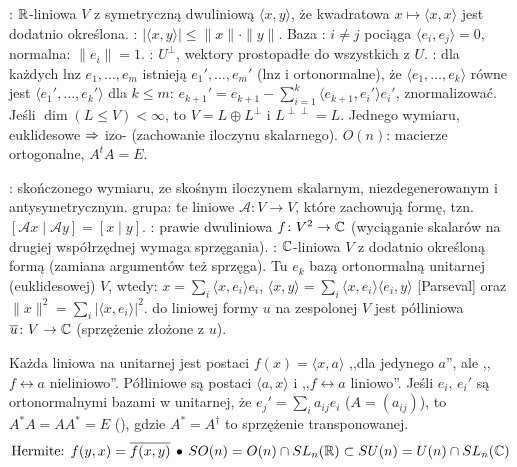 :  $\mathbb{R}$-liniowa $V$ z symetryczną dwuliniową $\langle x,y\rangle$, że kwadratowa $x \mapsto \langle x,x\rangle$ jest dodatnio określona. 
: $|\langle x,y\rangle| \le \|x\| \cdot \|y\|$.
Baza : $i \neq j$ pociąga $\langle e_i, e_j \rangle = 0$, normalna: $\|e_i\| = 1$.
: $U^\perp$, wektory prostopadłe do wszystkich z $U$.
: dla każdych lnz $e_1, \dots, e_m$ istnieją $e_1', \dots, e_m'$ (lnz i ortonormalne), że $\langle e_1, \dots, e_k \rangle$ równe jest $\langle e_1', \dots, e_k'\rangle$ dla $k \le m$: $e_{k+1}' = e_{k+1} - \sum_{i=1}^k \langle e_{k+1}, e_i'\rangle e_i'$, znormalizować.
Jeśli $\dim (L \le V) < \infty$, to $V = L \oplus L ^\perp$ i $L^{\perp\perp} = L$.
Jednego wymiaru, euklidesowe $\Rightarrow$ izo- (zachowanie iloczynu skalarnego).
$O(n)$: macierze ortogonalne, $A^tA = E$.

: skończonego wymiaru, ze skośnym iloczynem skalarnym, niezdegenerowanym i antysymetrycznym.
 grupa: te liniowe $\mathcal A \colon V \to V$, które zachowują formę, tzn. $[\mathcal Ax \mid \mathcal Ay] = [x \mid y]$.
:  prawie dwuliniowa $f \colon V^2 \to \mathbb{C}$ (wyciąganie skalarów na drugiej współrzędnej wymaga sprzęgania).
: $\mathbb{C}$-liniowa $V$ z dodatnio określoną formą  (zamiana argumentów też sprzęga).
Tu $e_k$ bazą ortonormalną unitarnej (euklidesowej) $V$, wtedy: $x = \sum_i \langle x, e_i \rangle e_i$, $\langle x, y\rangle = \sum_i \langle x, e_i \rangle \langle e_i, y\rangle$ [Parseval] oraz $\|x\|^2 = \sum_i |\langle x, e_i\rangle|^2$.
 do liniowej formy $u$ na zespolonej $V$ jest półliniowa $\overline u \colon V \to \mathbb{C}$ (sprzężenie złożone z $u$).

Każda liniowa na unitarnej jest postaci $f(x) = \langle x,a \rangle$ ,,dla jedynego $a$'', ale ,,$f \leftrightarrow a$ nieliniowo''.
Półliniowe są postaci $\langle a, x \rangle$ i ,,$f \leftrightarrow a$ liniowo''.
Jeśli $e_i$, $e_i'$ są ortonormalnymi bazami w unitarnej, że $e_j' = \sum_i a_{ij} e_i$ ($A = (a_{ij})$), to $A^*A = AA^* = E$ (), gdzie $A^* = A^\dagger$ to sprzężenie transponowanej.
\[
	\textrm{Hermite: }  f(y,x) = \overline{f(x,y)} \, \bullet \,
	SO(n) = O(n) \cap SL_n(\mathbb{R}) \subset SU(n) = U(n) \cap SL_n(\mathbb{C})
\]

